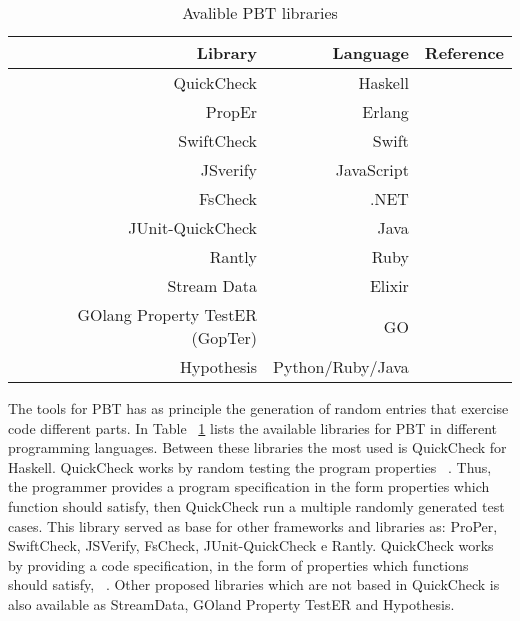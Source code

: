	\begin{table}[ht]
		\begin{center}
		    \begin{tabular}{|r|r|r|}
		    \hline
		    \textbf{Library} & \textbf{Language} & \textbf{Reference} \\ \hline
		    QuickCheck & Haskell & ~\cite{quickcheck} \\ \hline
		    PropEr & Erlang & ~\cite{proper} \\ \hline
		    SwiftCheck & Swift & ~\cite{swiftcheck} \\ \hline
		    JSverify & JavaScript & ~\cite{jsverify} \\ \hline
		    FsCheck & .NET & ~\cite{fscheck} \\ \hline
		    JUnit-QuickCheck & Java & ~\cite{junit} \\ \hline
		    Rantly & Ruby & ~\cite{rantly} \\ \hline
		    Stream Data & Elixir & ~\cite{stream} \\ \hline
		    GOlang Property TestER (GopTer) & GO & ~\cite{gopter} \\ \hline
		    Hypothesis & Python/Ruby/Java & ~\cite{hyp} \\ \hline 
	    	\end{tabular}
		\end{center}
		\label{tab:libraries}
		\caption{Avalible PBT libraries}
	\end{table}

	The tools for PBT has as principle the generation of random entries that exercise code different parts. In Table ~\ref{tab:libraries} lists the available libraries for PBT in different programming languages. Between these libraries the most used is QuickCheck for Haskell. QuickCheck works by random testing the program properties ~\cite{quickcheck}. Thus, the programmer provides a program specification in the form properties which function should satisfy, then QuickCheck run a multiple randomly generated test cases. This library served as base for other frameworks and libraries as: ProPer, SwiftCheck, JSVerify, FsCheck, JUnit-QuickCheck e Rantly. QuickCheck works by providing a code specification, in the form of properties which functions should satisfy,  ~\cite{quickcheck}. Other proposed libraries which are not based in QuickCheck is also available as StreamData, GOland Property TestER and Hypothesis. 